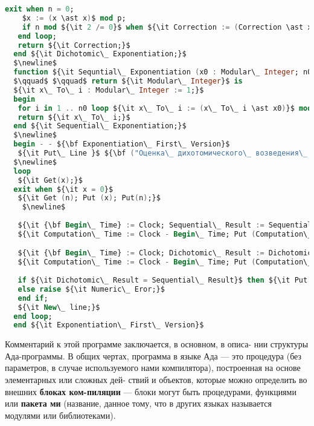 \newpage
\begin{lstlisting}[mathescape=true, language=Ada, basicstyle=\small, frame=lrb]
   exit when n = 0;
    $x := (x \ast x)$ mod p;
    if n mod ${\it 2 /= 0}$ when ${\it Correction := (Correction \ast x)}$ mod p;
   end loop;
   return ${\it Correction;}$
  end ${\it Dichotomic\_ Exponentiation;}$
  $\newline$
  function ${\it Sequntial\_ Exponentiation (x0 : Modular\_ Integer; n0 : Long\_ Intege)}$
  $\qquad$ $\qquad$ return ${\it Modular\_ Integer}$ is
  ${\it x\_ To\_ i : Modular\_ Integer := 1;}$
  begin
   for i in 1 .. n0 loop ${\it x\_ To\_ i := (x\_ To\_ i \ast x0)}$ mod p; end loop;
   return ${\it x\_ To\_ i;}$
  end ${\it Sequential\_ Exponentiation;}$
  $\newline$
  begin - - ${\bf Exponentiation\_ First\_ Version}$
   ${\it Put\_ Line }$ ${\bf ("Оценка\_ дихотомического\_ возведения\_ в\_ степень.\_");}$
  $\newline$
  loop
   ${\it Get(x);}$
  exit when ${\it x = 0}$
   ${\it Get (n); Put (x); Put(n);}$
    $\newline$
  
   ${\it {\bf Begin\_ Time} := Clock; Sequential\_ Result := Sequential\_ Exponentiation (x, n);}$
   ${\it Computation\_ Time := Clock - Begin\_ Time; Put (Computation\_ Time);}$

   ${\it {\bf Begin\_ Time} := Clock; Dichotomic\_ Result := Dichotomic\_ Exponentiation (x, n);}$
   ${\it Computation\_ Time := Clock - Begin\_ Time; Put (Computation\_ Time);}$
  
   if ${\it Dichotomic\_ Result = Sequential\_ Result}$ then ${\it Put  (Dichotomic\_ Result);}$
   else raise ${\it Numeric\_ Eror;}$
   end if;
   ${\it New\_ line;}$
  end loop;
  end ${\it Exponentiation\_ First\_ Version}$
  \end{lstlisting} 

Комментарий к этой программе заключается, в основном, в описа­-\linebreak
нии структуры Ада-программы. В общих чертах, программа в языке\linebreak
Ада — это процедура (без параметров, в случае используемого нами\linebreak
компилятора), построенная на основе элементарных или сложных дей­-\linebreak
ствий и объектов, которые можно определить во внешних {\bf блоках ком­-\linebreak пиляции} — блоки могут быть процедурами, функциями или {\bf пакета­\linebreak
ми} (название, данное тому, что в других языках называется модулями\linebreak
или библиотеками).

